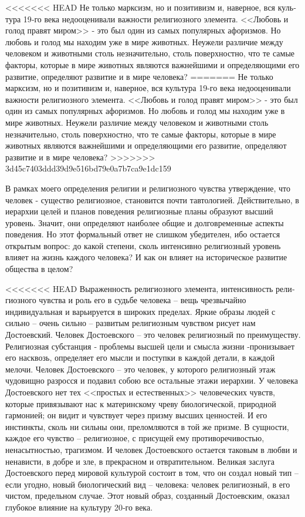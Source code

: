 \documentclass{book}
\begin{document}
<<<<<<< HEAD
Не только марксизм, но и позитивизм и, наверное, вся куль­тура 19‑го века недооценивали важности религиозного элемен­та. <<Любовь и голод правят миром>> ‑ это был один из самых популярных афоризмов. Но любовь и голод мы находим уже в мире животных. Неужели различие между человеком и живот­ными столь незначительно, столь поверхностно, что те самые факторы, которые в мире животных являются важнейшими и определяющими его развитие, определяют развитие и в мире человека?
=======
Не только марксизм, но и позитивизм и, наверное, вся куль­тура 19-го века недооценивали важности религиозного элемен­та. <<Любовь и голод правят миром>> - это был один из самых популярных афоризмов. Но любовь и голод мы находим уже в мире животных. Неужели различие между человеком и живот­ными столь незначительно, столь поверхностно, что те самые факторы, которые в мире животных являются важнейшими и определяющими его развитие, определяют развитие и в мире человека?
>>>>>>> 3d45c7403ddd39d9e516bd79e0a7b7ca9e1dc159

В рамках моего определения религии и религиозного чувст­ва утверждение, что человек - существо религиозное, становит­ся почти тавтологией. Действительно, в иерархии целей и планов поведения религиозные планы образуют высший уровень. Зна­чит, они определяют наиболее общие и долговременные аспек­ты поведения. Но этот формальный ответ не слишком убеди­телен, ибо остается открытым вопрос: до какой степени, сколь интенсивно религиозный уровень влияет на жизнь каждого человека? И как он влияет на историческое развитие общест­ва в целом?

<<<<<<< HEAD
Выраженность религиозного элемента, интенсивность рели­гиозного чувства и роль его в судьбе человека -- вещь чрезвы­чайно индивидуальная и варьируется в широких пределах. Яр­кие образы людей с сильно -- очень сильно -- развитым религи­озным чувством рисует нам Достоевский. Человек Достоев­ского -- это человек религиозный по преимуществу.  Религиоз­ная субстанция ‑ проблемы высшей цели и смысла жизни ‑пронизывает его насквозь, определяет его мысли и поступки в каждой детали, в каждой мелочи. Человек Достоевского -- это человек, у которого религиозный этаж чудовищно разрос­ся и подавил собою все остальные этажи иерархии. У человека Достоевского нет тех <<простых и естественных>> человеческих чувств, которые привязывают нас к материнскому чреву био­логической, природной гармонией; он видит и чувствует через призму высших ценностей. И его инстинкты, сколь ни сильны они, преломляются в той же призме. В сущности, каждое его чувство -- религиозное, с присущей ему противоречивостью, ненасытностью, трагизмом. И человек Достоевского остается таковым в любви и ненависти, в добре и зле, в прекрасном и отвратительном. Великая заслуга Достоевского перед мировой культурой состоит в том, что он создал новый тип -- если угодно, новый биологический вид -- человека: человек религиозный, в его чистом, предельном случае. Этот новый образ, созданный Достоевским, оказал глубокое влияние на культуру 20‑го века.
\end{document}
